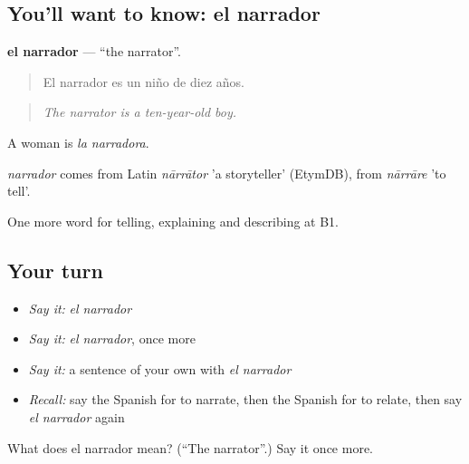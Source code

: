 \subsection*{You'll want to know: el narrador}
\textbf{el narrador} — \textquotedblleft{}the narrator\textquotedblright{}.

\begin{quote}
El narrador es un niño de diez años.
\end{quote}

\begin{quote}
\emph{The narrator is a ten-year-old boy.}
\end{quote}

A woman is \emph{la narradora}.

\begin{cousinweb}
\emph{narrador} comes from Latin \emph{nārrātor} 'a storyteller' (EtymDB), from \emph{nārrāre} 'to tell'.
\end{cousinweb}

\begin{grammarlens}[title={What you've built}]
One more word for telling, explaining and describing at B1.
\end{grammarlens}

\subsection*{Your turn}
\begin{itemize}
\raggedright
  \item \emph{Say it:} \emph{el narrador}
  \item \emph{Say it:} \emph{el narrador}, once more
  \item \emph{Say it:} a sentence of your own with \emph{el narrador}
  \item \emph{Recall:} say the Spanish for to narrate, then the Spanish for to relate, then say \emph{el narrador} again
\end{itemize}

\begin{tcolorbox}[breakable,colback=teal!4,colframe=teal!35!black,title={Before you move on}]
What does el narrador mean? (\textquotedblleft{}The narrator\textquotedblright{}.) Say it once more.
\end{tcolorbox}
